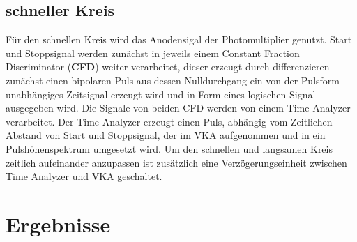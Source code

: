 \documentclass[a4paper,12pt]{article}
\begin{document}
\subsection*{schneller Kreis}
	Für den schnellen Kreis wird das Anodensigal der Photomultiplier genutzt. Start und Stoppsignal werden zunächst in jeweils einem Constant
	Fraction Discriminator (\textbf{CFD}) weiter verarbeitet, dieser erzeugt durch differenzieren zunächst einen bipolaren Puls aus dessen Nulldurchgang
	ein von der Pulsform unabhängiges Zeitsignal erzeugt wird und in Form eines logischen Signal ausgegeben wird. Die Signale von beiden
	CFD werden von einem Time Analyzer verarbeitet. Der Time Analyzer erzeugt einen Puls, abhängig vom Zeitlichen Abstand von Start und Stoppsignal,
	der im VKA aufgenommen und in ein Pulshöhenspektrum umgesetzt wird. Um den schnellen und langsamen Kreis zeitlich aufeinander 
	anzupassen ist zusätzlich eine Verzögerungseinheit zwischen Time Analyzer und VKA geschaltet.
	
\section{Ergebnisse}
\end{document}

